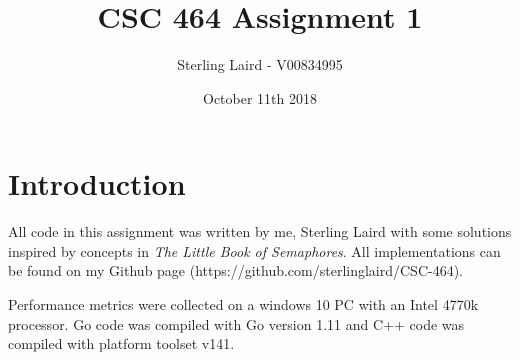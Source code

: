 \documentclass[11pt]{article}
\title{CSC 464 Assignment 1}
\author{Sterling Laird - V00834995}
\date{October 11th 2018}
\begin{document}
\maketitle

\section{Introduction}
All code in this assignment was written by me, Sterling Laird with some solutions inspired by concepts in \textit{The Little Book of Semaphores}. All implementations can be found on my Github page (https://github.com/sterlinglaird/CSC-464).\linebreak

\noindent Performance metrics were collected on a windows 10 PC with an Intel 4770k processor. Go code was compiled with Go version 1.11 and C++ code was compiled with platform toolset v141.

\pagebreak
\end{document}
